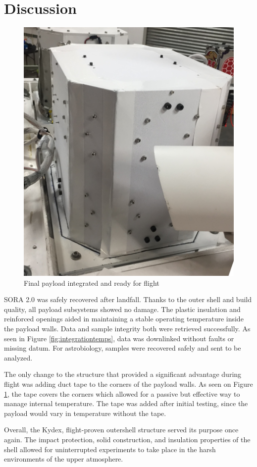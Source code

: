 \section{Discussion}
\label{sec:Discussion}
\begin{figure}[h!]
	\begin{center}
		\includegraphics[width=70 mm, scale=1]{figures/payload_integrated.JPG}
		\caption{Final payload integrated and ready for flight}
		\label{fig:payload_int}
	\end{center}
\end{figure}

SORA 2.0 was safely recovered after landfall.  Thanks to the outer shell and build quality, all payload subsystems showed no damage.  
The plastic insulation and reinforced openings aided in maintaining a stable operating temperature inside the payload walls.  
Data and sample integrity both were retrieved successfully.  As seen in Figure \ref{fig:integrationtemps}, data was downlinked without faults or 
missing datum. For astrobiology, samples were recovered safely and sent to be analyzed.  

The only change to the structure that provided a significant advantage during flight was adding duct tape to the corners of the payload walls.  As seen on Figure \ref{fig:payload_int}, the tape covers the corners which allowed for a passive but effective way to manage internal temperature.  The tape was added after initial testing, since the payload would vary in temperature without the tape.  

Overall, the Kydex, flight-proven outershell structure served its purpose once again.  The impact protection, solid construction, and insulation properties of the shell allowed for uninterrupted experiments to take place in the harsh environments of the upper atmosphere.